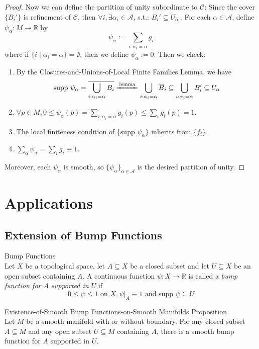 \begin{proof}
    Now we can define the partition of unity subordinate to $\mathcal{C}$: Since the cover $\{B_i'\}$ is refinement of $\mathcal{C}$, then $\forall i, \exists \alpha_i \in \mathcal{A}$, s.t.: $B_i' \subseteq U_{\alpha_i}$. For each $\alpha\in \mathcal{A}$, define $\psi_\alpha:M \to \mathbb{R}$ by
    \[
    \psi_\alpha:= \sum_{i: \alpha_i=\alpha} g_i
    \]
    where if $\{i \mid \alpha_i=\alpha\}= \emptyset$, then we define $\psi_\alpha:=0$. Then we check:
    \begin{enumerate}
        \item By the Closures-and-Unions-of-Local Finite Families Lemma, we have
        \[
        \text{supp }\psi_\alpha= \overline{\bigcup_{i: \alpha_i=\alpha}B_i} \xlongequal{\text{lemma}} \bigcup_{i: \alpha_i=\alpha}\overline{B}_i \subseteq \bigcup_{i: \alpha_i=\alpha} B_i' \subseteq U_\alpha
        \]

        \item $\forall p\in M,0 \leq \psi_\alpha(p)= \sum_{i: \alpha_i=\alpha} g_i(p) \leq \sum_i g_i(p)=1$.
        \item The local finiteness condition of $\{ \text{supp }\psi_\alpha\}$ inherits from $\{f_i\}$.
        \item $\sum_\alpha \psi_\alpha= \sum_ig_i \equiv1$.
    \end{enumerate}
    Moreover, each $\psi_\alpha$ is smooth, so $\{\psi_\alpha\}_{\alpha \in \mathcal{A}}$ is the desired partition of unity.
\end{proof}


\section{Applications}

\subsection{Extension of Bump Functions}

\begin{definition}{Bump Functions}\\
Let $X$ be a topological space, let $A\subseteq X$ be a closed subset and let $U\subseteq X$ be an open subset containing $A$. A continuous function $\psi: X\to \mathbb{R}$ is called a \textit{bump function for $A$ supported in $U$} if
\[
0\leq \psi\leq 1 \text{ on }X, \psi|_A\equiv 1 \text{ and supp } \psi \subseteq U
\]
\end{definition}

\begin{proposition}{Existence-of-Smooth Bump Functions-on-Smooth Manifolds Proposition}\\
Let $M$ be a smooth manifold with or without boundary. For any closed subset $A\subseteq M$ and any open subset $U\subseteq M$ containing $A$, there is a smooth bump function for $A$ supported in $U$.
\end{proposition}


